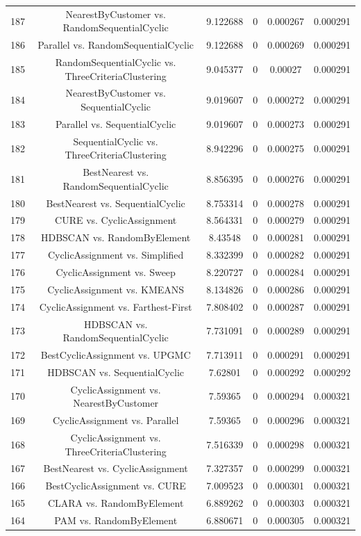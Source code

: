 \documentclass[a4paper,10pt]{article}
\begin{document}
\begin{landscape}
\begin{table}[!htp]
\begin{tabular}{cccccc}
187&NearestByCustomer vs. RandomSequentialCyclic&9.122688&0&0.000267&0.000291\\
186&Parallel vs. RandomSequentialCyclic&9.122688&0&0.000269&0.000291\\
185&RandomSequentialCyclic vs. ThreeCriteriaClustering&9.045377&0&0.00027&0.000291\\
184&NearestByCustomer vs. SequentialCyclic&9.019607&0&0.000272&0.000291\\
183&Parallel vs. SequentialCyclic&9.019607&0&0.000273&0.000291\\
182&SequentialCyclic vs. ThreeCriteriaClustering&8.942296&0&0.000275&0.000291\\
181&BestNearest vs. RandomSequentialCyclic&8.856395&0&0.000276&0.000291\\
180&BestNearest vs. SequentialCyclic&8.753314&0&0.000278&0.000291\\
179&CURE vs. CyclicAssignment&8.564331&0&0.000279&0.000291\\
178&HDBSCAN vs. RandomByElement&8.43548&0&0.000281&0.000291\\
177&CyclicAssignment vs. Simplified&8.332399&0&0.000282&0.000291\\
176&CyclicAssignment vs. Sweep&8.220727&0&0.000284&0.000291\\
175&CyclicAssignment vs. KMEANS&8.134826&0&0.000286&0.000291\\
174&CyclicAssignment vs. Farthest-First&7.808402&0&0.000287&0.000291\\
173&HDBSCAN vs. RandomSequentialCyclic&7.731091&0&0.000289&0.000291\\
172&BestCyclicAssignment vs. UPGMC&7.713911&0&0.000291&0.000291\\
171&HDBSCAN vs. SequentialCyclic&7.62801&0&0.000292&0.000292\\
170&CyclicAssignment vs. NearestByCustomer&7.59365&0&0.000294&0.000321\\
169&CyclicAssignment vs. Parallel&7.59365&0&0.000296&0.000321\\
168&CyclicAssignment vs. ThreeCriteriaClustering&7.516339&0&0.000298&0.000321\\
167&BestNearest vs. CyclicAssignment&7.327357&0&0.000299&0.000321\\
166&BestCyclicAssignment vs. CURE&7.009523&0&0.000301&0.000321\\
165&CLARA vs. RandomByElement&6.889262&0&0.000303&0.000321\\
164&PAM vs. RandomByElement&6.880671&0&0.000305&0.000321\\

\end{tabular}
\end{table}
\end{landscape}
\end{document}
